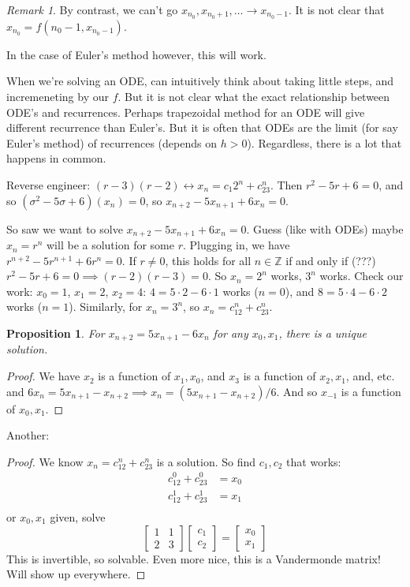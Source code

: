 \documentclass{article}
\theoremstyle{plain}
\newtheorem{proposition}{Proposition}
\theoremstyle{remark}
\newtheorem{remark}{Remark}
\newcommand{\Z}{{\mathbb Z}}
\begin{document}
\begin{remark}
	By contrast, we can't go $x_{n_0}, x_{n_0+1},\dots \to x_{n_0-1}$.
	It is not clear that $x_{n_0} = f(n_0-1,x_{n_0-1})$.
\end{remark}
In the case of Euler's method however, this will work.

When we're solving an ODE, can intuitively think about taking little steps,
and incremeneting by our $f$.
But it is not clear what the exact relationship between ODE's and recurrences.
Perhaps trapezoidal method for an ODE will give different recurrence than Euler's.
But it is often that ODEs are the limit (for say Euler's method) of recurrences
(depends on $h > 0$).
Regardless, there is a lot that happens in common.

Reverse engineer:
$(r-3)(r-2) \leftrightarrow x_n = c_1 2^n + c_23^n$.
Then $r^2 -  5r + 6 = 0$, and so $(\sigma^2 - 5\sigma + 6)(x_n) = 0$,
so $x_{n+2} - 5x_{n+1} + 6x_n = 0$.

So saw we want to solve $x_{n+2} - 5x_{n+1} + 6x_n = 0$.
Guess (like with ODEs) maybe $x_n = r^n$ will  be a solution for some $r$.
Plugging in, we have
$r^{n+2} - 5r^{n+1} + 6r^n = 0$.
If $r \neq 0$, this holds for all $n \in \Z$ if and only if (???)
$r^2 - 5r + 6 = 0 \implies (r-2)(r-3) = 0$.
So $x_n = 2^n$ works, $3^n$ works.
Check our work: $x_0 = 1$, $x_1 = 2$, $x_2 = 4$:
$4 = 5 \cdot 2 - 6 \cdot 1$ works ($n=0$),
and $8 = 5\cdot 4 - 6\cdot 2$ works ($n=1$).
Similarly, for $x_n = 3^n$, so $x_n = c_12^n + c_23^n$.

\begin{proposition}
	For $x_{n+2} = 5x_{n+1} - 6x_n$ for any $x_0,x_1$, there is a unique solution.
\end{proposition}
\begin{proof}
	We have $x_2$ is a function of $x_1,x_0$, and
	$x_3$ is a function of $x_2,x_1$, and, etc.
	and $6x_n = 5x_{n+1} - x_{n+2} \implies x_n = (5x_{n+1} - x_{n+2})/6$.
	And so $x_{-1}$ is a function of $x_0,x_1$.
\end{proof}
Another:
\begin{proof}
	We know $x_n = c_12^n + c_23^n$ is a solution.
	So find $c_1,c_2$ that works:
	\begin{align*}
		c_12^0 + c_23^0 &= x_0\\
		c_12^1 + c_23^1 &= x_1\\
	\end{align*}
	or $x_0,x_1$ given, solve
	\[
		\begin{bmatrix}
			1 & 1\\ 2 & 3
		\end{bmatrix}
		\begin{bmatrix} c_1 \\ c_2 \end{bmatrix}
		= \begin{bmatrix} x_0 \\ x_1 \end{bmatrix}
	\]
	This is invertible, so solvable.
	Even more nice, this is a Vandermonde matrix! Will show up everywhere.
\end{proof}
\end{document}
